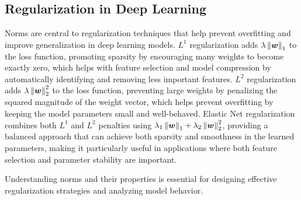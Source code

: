 \subsection{Regularization in Deep Learning}

Norms are central to regularization techniques that help prevent overfitting and improve generalization in deep learning models. $L^1$ regularization adds $\lambda\left\lVert\boldsymbol{w}\right\rVert_1$ to the loss function, promoting sparsity by encouraging many weights to become exactly zero, which helps with feature selection and model compression by automatically identifying and removing less important features. $L^2$ regularization adds $\lambda\left\lVert\boldsymbol{w}\right\rVert_2^2$ to the loss function, preventing large weights by penalizing the squared magnitude of the weight vector, which helps prevent overfitting by keeping the model parameters small and well-behaved. Elastic Net regularization combines both $L^1$ and $L^2$ penalties using $\lambda_1\left\lVert\boldsymbol{w}\right\rVert_1 + \lambda_2\left\lVert\boldsymbol{w}\right\rVert_2^2$, providing a balanced approach that can achieve both sparsity and smoothness in the learned parameters, making it particularly useful in applications where both feature selection and parameter stability are important.

Understanding norms and their properties is essential for designing effective regularization strategies and analyzing model behavior.
